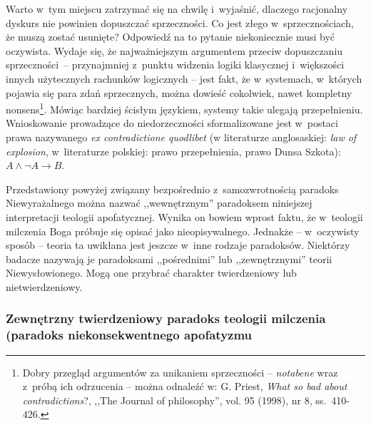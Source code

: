 Warto w~tym miejscu zatrzymać się na chwilę i~wyjaśnić, dlaczego racjonalny dyskurs nie powinien dopuszczać sprzeczności. Co jest złego w~sprzecznościach, że muszą zostać usunięte? Odpowiedź na to pytanie niekoniecznie musi być oczywista. Wydaje się, że najważniejszym argumentem przeciw dopuszczaniu sprzeczności~-- przynajmniej z~punktu widzenia logiki klasycznej i~większości innych użytecznych rachunków logicznych -- jest fakt, że w~systemach, w~których pojawia się para zdań sprzecznych, można dowieść cokolwiek, nawet kompletny nonsens\footnote{Dobry przegląd argumentów za unikaniem sprzeczności -- \textit{notabene} wraz z~próbą ich odrzucenia -- można odnaleźć w: G. Priest, \textit{What so bad about contradictions}?, ,,The Journal of philosophy'', vol. 95 (1998), nr 8, ss.~410-426.}. Mówiąc bardziej ścisłym językiem, systemy takie ulegają przepełnieniu. Wnioskowanie prowadzące do niedorzeczności sformalizowane jest w~postaci prawa nazywanego \textit{ex contradictione quodlibet} (w literaturze anglosaskiej: \textit{law of explosion}, w~literaturze polskiej: prawo przepełnienia, prawo Dunsa Szkota): $A \land \neg A \to B$.

Przedstawiony powyżej związany bezpośrednio z~samozwrotnością paradoks Niewyrażalnego można nazwać ,,wewnętrznym'' paradoksem niniejszej interpretacji teologii apofatycznej. Wynika on bowiem wprost faktu, że w~teologii milczenia Boga próbuje się opisać jako nieopisywalnego. Jednakże -- w~oczywisty sposób -- teoria ta uwikłana jest jeszcze w~inne rodzaje paradoksów. Niektórzy badacze nazywają je paradoksami ,,pośrednimi'' lub ,,zewnętrznymi'' teorii Niewysłowionego. Mogą one przybrać charakter twierdzeniowy lub nietwierdzeniowy.


\subsubsection{Zewnętrzny twierdzeniowy paradoks teologii milczenia (paradoks niekonsekwentnego apofatyzmu}

